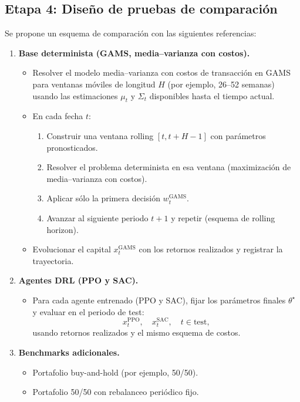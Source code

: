 \documentclass[12pt]{article}
\begin{document}
\subsection{Etapa 4: Diseño de pruebas de comparación}
Se propone un esquema de comparación con las siguientes referencias:
\begin{enumerate}
    \item \textbf{Base determinista (GAMS, media–varianza con costos).}
    \begin{itemize}
        \item Resolver el modelo media–varianza con costos de transacción en GAMS para ventanas móviles de longitud $H$ (por ejemplo, 26–52 semanas) usando las estimaciones $\mu_t$ y $\Sigma_t$ disponibles hasta el tiempo actual.
        \item En cada fecha $t$:
        \begin{enumerate}
            \item[(a)] Construir una ventana rolling $[t, t+H-1]$ con parámetros pronosticados.
            \item[(b)] Resolver el problema determinista en esa ventana (maximización de media–varianza con costos).
            \item[(c)] Aplicar sólo la primera decisión $w^{\text{GAMS}}_t$.
            \item[(d)] Avanzar al siguiente periodo $t + 1$ y repetir (esquema de rolling horizon).
        \end{enumerate}
        \item Evolucionar el capital $x^{\text{GAMS}}_t$ con los retornos realizados y registrar la trayectoria.
    \end{itemize}
    \item \textbf{Agentes DRL (PPO y SAC).}
    \begin{itemize}
        \item Para cada agente entrenado (PPO y SAC), fijar los parámetros finales $\theta^\star$ y evaluar en el periodo de test:
        $$x^{\text{PPO}}_t, \quad x^{\text{SAC}}_t, \quad t \in \text{test},$$
        usando retornos realizados y el mismo esquema de costos.
    \end{itemize}
    \item \textbf{Benchmarks adicionales.}
    \begin{itemize}
        \item Portafolio buy-and-hold (por ejemplo, 50/50).
        \item Portafolio 50/50 con rebalanceo periódico fijo.
    \end{itemize}
\end{enumerate}
\end{document}
